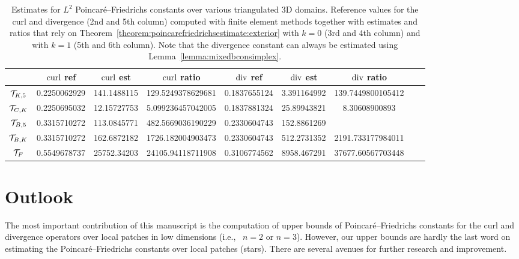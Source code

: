 \documentclass[10pt,a4paper]{article}
\begin{document}
\begin{table}[t]
    \color{red}
    \centering
    \begin{tabular}{|c|c|c|c|c|c|c|c|c|}
        \hline
                        & $\operatorname{curl}$ ref  & $\operatorname{curl}$ est & $\operatorname{curl}$ ratio     & $\operatorname{div}$ ref & $\operatorname{div}$ est & $\operatorname{div}$ ratio \\ 
        \hline
        ${\mathcal T}_{K,5}$   & 0.2250062929 & 141.1488115 & 129.5249378629681 & 0.1837655124      & 3.391164992       & 139.7449800105412   \\
        \hline
        ${\mathcal T}_{C,K}$   & 0.2250695032 & 12.15727753 & 5.099236457042005 & 0.1837881324      & 25.89943821       &  8.30608900893      \\
        \hline
        ${\mathcal T}_{B,5}$   & 0.3315710272 & 113.0845771 & 482.5669036190229 & 0.2330604743      & 152.8861269       &    \\
        \hline
        ${\mathcal T}_{B,K}$   & 0.3315710272 & 162.6872182 & 1726.182004903473 & 0.2330604743      & 512.2731352       & 2191.733177984011   \\
        \hline
        ${\mathcal T}_{F}$     & 0.5549678737 & 25752.34203 & 24105.94118711908 & 0.3106774562      & 8958.467291       & 37677.60567703448   \\ 
        \hline
    \end{tabular}
    \caption{
    Estimates for $L^2$ Poincar\'e--Friedrichs constants over various triangulated 3D domains.
    Reference values for the curl and divergence (2nd and 5th column) computed with finite element methods together with estimates and ratios
    that rely on Theorem~\ref{theorem:poincarefriedrichsestimate:exterior} with $k=0$ (3rd and 4th column) and with $k=1$ (5th and 6th column).
    Note that the divergence constant can always be estimated using Lemma~\ref{lemma:mixedbconsimplex}.
    }\label{table:estimates3D:curldiv}
\end{table}





\section{Outlook}\label{section:outlook}

The most important contribution of this manuscript is the computation of upper bounds of Poincar\'e--Friedrichs constants for the curl and divergence operators over local patches in low dimensions (i.e., \ $n=2$ or $n=3$). 
However, our upper bounds are hardly the last word on estimating the Poincar\'e--Friedrichs constants over local patches (stars). There are several avenues for further research and improvement. 
\end{document}
